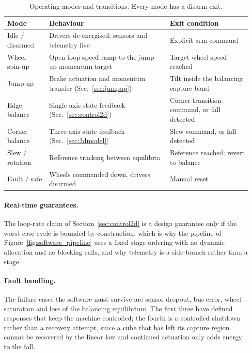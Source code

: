 \begin{table}[htbp]
\centering
\caption[Operating modes and transitions]{Operating modes and transitions. Every mode has a disarm exit.}
\label{tab:sw_modes}
\small
\begin{tabular}{L{2.6cm} L{5.2cm} L{6.0cm}}
\toprule
Mode & Behaviour & Exit condition \\
\midrule
Idle / disarmed & Drivers de-energised; sensors and telemetry live & Explicit arm command \\
Wheel spin-up   & Open-loop speed ramp to the jump-up momentum target & Target wheel speed reached \\
Jump-up         & Brake actuation and momentum transfer (Sec.~\ref{sec:jumpup}) & Tilt inside the balancing capture band \\
Edge balance    & Single-axis state feedback (Sec.~\ref{sec:control2d}) & Corner-transition command, or fall detected \\
Corner balance  & Three-axis state feedback (Sec.~\ref{sec:3dmodel}) & Slew command, or fall detected \\
Slew / rotation & Reference tracking between equilibria & Reference reached; revert to balance \\
Fault / safe    & Wheels commanded down, drivers disarmed & Manual reset \\
\bottomrule
\end{tabular}
\end{table}

\paragraph{Real-time guarantees.} The loop-rate claim of
Section~\ref{sec:control2d} is a design guarantee only if the worst-case cycle
is bounded by construction, which is why the pipeline of
Figure~\ref{fig:software_pipeline} uses a fixed stage ordering with no dynamic
allocation and no blocking calls, and why telemetry is a side-branch rather than
a stage.

\paragraph{Fault handling.} The failure cases the software must survive are
sensor dropout, bus error, wheel saturation and loss of the balancing
equilibrium. The first three have defined responses that keep the machine
controlled; the fourth is a controlled shutdown rather than a recovery attempt,
since a cube that has left its capture region cannot be recovered by the
linear law and continued actuation only adds energy to the fall.
